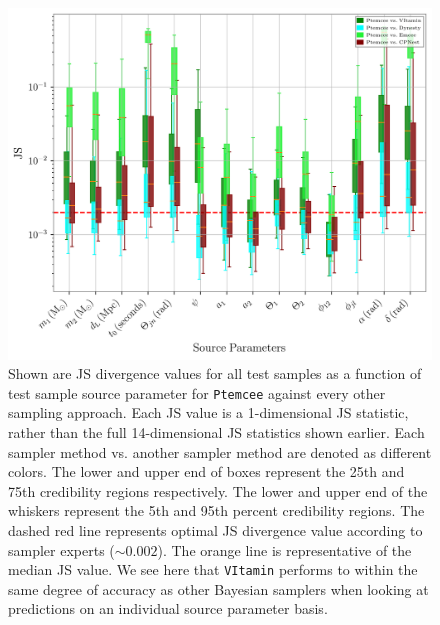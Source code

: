 \begin{figure}
    \includegraphics[width=\columnwidth]{figures/JS_IndiPar_ptemcee_nature_paper.png}
    \caption[JS divergences of individual source parameters for \texttt{Ptemcee} against all other approaches.]{\label{fig:JS_indi_par_ptemcee} Shown are JS divergence values for all test samples as a function of test sample source parameter for \texttt{Ptemcee} against every other sampling approach. Each JS value is a 1-dimensional JS statistic, rather than the full 14-dimensional JS statistics shown earlier. Each sampler method vs. another sampler method are denoted as different colors. The lower and upper end of boxes represent the 25th and 75th credibility regions respectively. The lower and upper end of the whiskers represent the 5th and 95th percent credibility regions. The dashed red line represents optimal JS divergence value according to sampler experts ($\sim 0.002$). The orange line is representative of the median JS value. We see here that \texttt{VItamin} performs to within the same degree of accuracy as other Bayesian samplers when looking at predictions on an individual source parameter basis.}
\end{figure}

